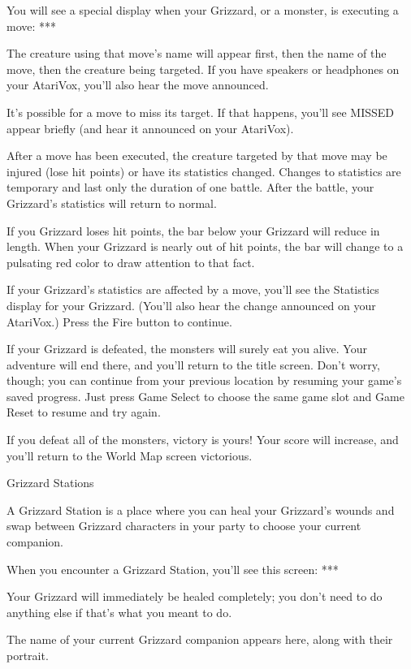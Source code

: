\documentclass[10pt,twoside,openright]{memoir}
\begin{document}
You will see a special display when your Grizzard, or a monster, is
executing a move: ***

The creature using that move's name will appear first, then the name of the
move, then the creature being targeted. If you have speakers or headphones
on your AtariVox, you'll also hear the move announced.

It's possible for a move to miss its target. If that happens, you'll see
MISSED appear briefly (and hear it announced on your AtariVox).

After a move has been executed, the creature targeted by that move may be
injured (lose hit points) or have its statistics changed. Changes to
statistics are temporary and last only the duration of one battle. After the
battle, your Grizzard's statistics will return to normal.

If you Grizzard loses hit points, the bar below your Grizzard will reduce in
length. When your Grizzard is nearly out of hit points, the bar will change
to a pulsating red color to draw attention to that fact.

If your Grizzard's statistics are affected by a move, you'll see the
Statistics display for your Grizzard. (You'll also hear the change announced
on your AtariVox.) Press the Fire button to continue.

If your Grizzard is defeated, the monsters will surely eat you alive. Your
adventure will end there, and you'll return to the title screen. Don't
worry, though; you can continue from your previous location by resuming your
game's saved progress. Just press Game Select to choose the same game slot
and Game Reset to resume and try again.

If you defeat all of the monsters, victory is yours! Your score will
increase, and you'll return to the World Map screen victorious.





Grizzard Stations

A Grizzard Station is a place where you can heal your Grizzard's wounds and
swap between Grizzard characters in your party to choose your current
companion.

When you encounter a Grizzard Station, you'll see this screen: ***

Your Grizzard will immediately be healed completely; you don't need to do
anything else if that's what you meant to do.

The name of your current Grizzard companion appears here, along with their
portrait.
\end{document}
